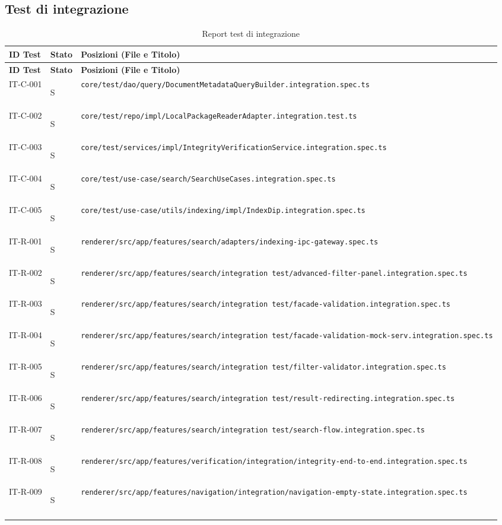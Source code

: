 \documentclass[a4paper,12pt]{article}
\newcommand{\ok}{\begin{center}S\end{center}}
\newcommand{\f}[1]{\nolinkurl{#1}\newline}
\begin{document}
\iffalse\subsection{Test di integrazione}

\setlength{\LTleft}{-0.4cm}
\renewcommand{\arraystretch}{1.2}
\begin{longtable}{|p{2.5cm}|p{2.0cm}|p{10.5cm}|}
\hline
\rowcolor{zpusgreen!30}
\textbf{ID Test} & \textbf{Stato} & \textbf{Posizioni (File e Titolo)} \\
\hline
\endfirsthead
\rowcolor{zpusgreen!30}
\textbf{ID Test} & \textbf{Stato} & \textbf{Posizioni (File e Titolo)} \\
\hline
\endhead
IT-C-001 & \ok & \f{core/test/dao/query/DocumentMetadataQueryBuilder.integration.spec.ts}                              \\ 
\hline
IT-C-002 & \ok & \f{core/test/repo/impl/LocalPackageReaderAdapter.integration.test.ts}                                 \\ 
\hline
IT-C-003 & \ok & \f{core/test/services/impl/IntegrityVerificationService.integration.spec.ts}                          \\ 
\hline
IT-C-004 & \ok & \f{core/test/use-case/search/SearchUseCases.integration.spec.ts}                                      \\ 
\hline
IT-C-005 & \ok & \f{core/test/use-case/utils/indexing/impl/IndexDip.integration.spec.ts}                               \\ 
\hline
IT-R-001 & \ok & \f{renderer/src/app/features/search/adapters/indexing-ipc-gateway.spec.ts}                            \\ 
\hline
IT-R-002 & \ok & \f{renderer/src/app/features/search/integration test/advanced-filter-panel.integration.spec.ts}       \\ 
\hline
IT-R-003 & \ok & \f{renderer/src/app/features/search/integration test/facade-validation.integration.spec.ts}           \\ 
\hline
IT-R-004 & \ok & \f{renderer/src/app/features/search/integration test/facade-validation-mock-serv.integration.spec.ts} \\ 
\hline
IT-R-005 & \ok & \f{renderer/src/app/features/search/integration test/filter-validator.integration.spec.ts}            \\ 
\hline
IT-R-006 & \ok & \f{renderer/src/app/features/search/integration test/result-redirecting.integration.spec.ts}          \\ 
\hline
IT-R-007 & \ok & \f{renderer/src/app/features/search/integration test/search-flow.integration.spec.ts}                 \\ 
\hline
IT-R-008 & \ok & \f{renderer/src/app/features/verification/integration/integrity-end-to-end.integration.spec.ts}       \\ 
\hline
IT-R-009 & \ok & \f{renderer/src/app/features/navigation/integration/navigation-empty-state.integration.spec.ts}       \\ 
\hline
\rowcolor{white}
\caption{Report test di integrazione}
\label{tab:test-integrazione}
\end{longtable}
\end{document}
